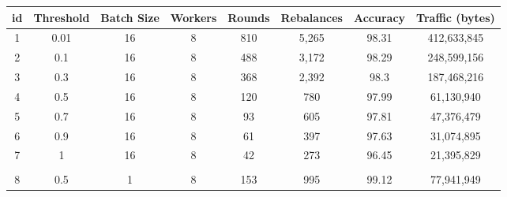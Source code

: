 \begin{table}[H]
    \begin{tabular}{|c|c|c|c|c|c|c|c|}
        \hline
        \textbf{id}            & \textbf{Threshold}    & \textbf{Batch Size}   & \textbf{Workers}      & \textbf{Rounds}       & \textbf{Rebalances}   & \textbf{Accuracy}     & \textbf{Traffic (bytes)} \\
        \hline
        1                      & 0.01                  & 16                    & 8                     & 810                   & 5,265                 & 98.31                 & 412,633,845              \\
        2                      & 0.1                   & 16                    & 8                     & 488                   & 3,172                 & 98.29                 & 248,599,156              \\
        3                      & 0.3                   & 16                    & 8                     & 368                   & 2,392                 & 98.3                  & 187,468,216              \\
        4                      & 0.5                   & 16                    & 8                     & 120                   & 780                   & 97.99                 & 61,130,940               \\
        5                      & 0.7                   & 16                    & 8                     & 93                    & 605                   & 97.81                 & 47,376,479               \\
        6                      & 0.9                   & 16                    & 8                     & 61                    & 397                   & 97.63                 & 31,074,895               \\
        7                      & 1                     & 16                    & 8                     & 42                    & 273                   & 96.45                 & 21,395,829               \\
        \hline
        \multicolumn{1}{|l|}{} & \multicolumn{1}{l|}{} & \multicolumn{1}{l|}{} & \multicolumn{1}{l|}{} & \multicolumn{1}{l|}{} & \multicolumn{1}{l|}{} & \multicolumn{1}{l|}{} & \multicolumn{1}{l|}{}    \\
        \hline
        8                      & 0.5                   & 1                     & 8                     & 153                   & 995                   & 99.12                 & 77,941,949               \\

\end{tabular}
\end{table}
